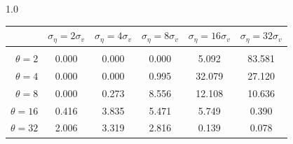 \documentclass[12pt]{article}
\begin{document}
\begin{table}[h!]
\vspace{10pt}
\begin{subtable}{1.0\textwidth}
    \centering
\begin{tabular}{rccccc}
\hline  
            & \multicolumn{1}{l}{$\sigma_{\eta} =2\sigma_{v}$} & \multicolumn{1}{l}{$\sigma_{\eta} =4\sigma_{v}$} & \multicolumn{1}{l}{$\sigma_{\eta} =8\sigma_{v}$} & \multicolumn{1}{l}{$\sigma_{\eta} =16\sigma_{v}$} & \multicolumn{1}{l}{$\sigma_{\eta} =32\sigma_{v}$} \\ \hline  \vspace{-3mm} \\        
$\theta=2$  & 0.000                                             & 0.000                                             & 0.000                                             & 5.092                                              & 83.581                                             \\ \hline
$\theta=4$  & 0.000                                             & 0.000                                             & 0.995                                             & 32.079                                             & 27.120                                             \\ \hline
$\theta=8$  & 0.000                                             & 0.273                                             & 8.556                                             & 12.108                                             & 10.636                                             \\ \hline
$\theta=16$ & 0.416                                             & 3.835                                             & 5.471                                             & 5.749                                              & 0.390                                              \\ \hline
$\theta=32$ & 2.006                                             & 3.319                                             & 2.816                                             & 0.139                                              & 0.078                                              \\ \hline
\end{tabular}
\end{subtable}


\end{table}
\end{document}
